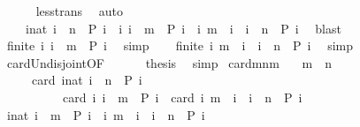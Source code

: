 \begin{isabellebody}
\ \ \ \ \isamarkupfalse%
\ less{\isacharunderscore}trans\ \isamarkupfalse%
\ auto\isanewline
\ \ \isamarkupfalse%
\ {}{\isacharcolon}\isanewline
\ \ \ \ {\isacartoucheopen}{\isacharbraceleft}i{\isacharcolon}{\isacharcolon}nat{\isachardot}\ i\ {\isacharless}\ n\ {\isasymand}\ P\ i{\isacharbraceright}\ {\isacharequal}\ {\isacharbraceleft}i{\isachardot}\ i\ {\isasymle}\ m\ {\isasymand}\ P\ i{\isacharbraceright}\ {\isasymunion}\ {\isacharbraceleft}i{\isachardot}\ m\ {\isacharless}\ i\ {\isasymand}\ i\ {\isacharless}\ n\ {\isasymand}\ P\ i{\isacharbraceright}{\isacartoucheclose}\ \isamarkupfalse%
\ blast\isanewline
\ \ \isamarkupfalse%
\ {}{\isacharcolon}{\isacartoucheopen}finite\ {\isacharbraceleft}i{\isachardot}\ i\ {\isasymle}\ m\ {\isasymand}\ P\ i{\isacharbraceright}{\isacartoucheclose}\ \isamarkupfalse%
\ simp\isanewline
\ \ \isamarkupfalse%
\ {}{\isacharcolon}{\isacartoucheopen}finite\ {\isacharbraceleft}i{\isachardot}\ m\ {\isacharless}\ i\ {\isasymand}\ i\ {\isacharless}\ n\ {\isasymand}\ P\ i{\isacharbraceright}{\isacartoucheclose}\ \isamarkupfalse%
\ simp\isanewline
\ \ \isamarkupfalse%
\ card{\isacharunderscore}Un{\isacharunderscore}disjoint{\isacharbrackleft}OF\ {}\ {}\ {}{\isacharbrackright}\ {}\ \isamarkupfalse%
\ {\isacharquery}thesis\ \isamarkupfalse%
\ simp\isanewline
{}\isamarkupfalse%
%
\endisatagproof
{\isafoldproof}%
%
\isadelimproof
\isanewline
%
\endisadelimproof
\isanewline
{}\isamarkupfalse%
\ card{\isacharunderscore}mnm{\isacharprime}{\isacharcolon}\isanewline
\ \ \ {\isacartoucheopen}m\ {\isacharless}\ n{\isacartoucheclose}\isanewline
\ \ \ \ \ {\isacartoucheopen}card\ {\isacharbraceleft}i{\isacharcolon}{\isacharcolon}nat{\isachardot}\ i\ {\isacharless}\ n\ {\isasymand}\ P\ i{\isacharbraceright}\isanewline
\ \ \ \ \ \ \ \ \ {\isacharequal}\ card\ {\isacharbraceleft}i{\isachardot}\ i\ {\isacharless}\ m\ {\isasymand}\ P\ i{\isacharbraceright}\ {\isacharplus}\ card\ {\isacharbraceleft}i{\isachardot}\ m\ {\isasymle}\ i\ {\isasymand}\ i\ {\isacharless}\ n\ {\isasymand}\ P\ i{\isacharbraceright}{\isacartoucheclose}\isanewline
%
\isadelimproof
%
\endisadelimproof
%
\isatagproof
{}\isamarkupfalse%
\ {\isacharminus}\isanewline
\ \ \isamarkupfalse%
\ {}{\isacharcolon}{\isacartoucheopen}{\isacharbraceleft}i{\isacharcolon}{\isacharcolon}nat{\isachardot}\ i\ {\isacharless}\ m\ {\isasymand}\ P\ i{\isacharbraceright}\ {\isasyminter}\ {\isacharbraceleft}i{\isachardot}\ m\ {\isasymle}\ i\ {\isasymand}\ i\ {\isacharless}\ n\ {\isasymand}\ P\ i{\isacharbraceright}\ {\isacharequal}\ {\isacharbraceleft}{\isacharbraceright}{\isacartoucheclose}\ \isamarkupfalse%

\end{isabellebody}
